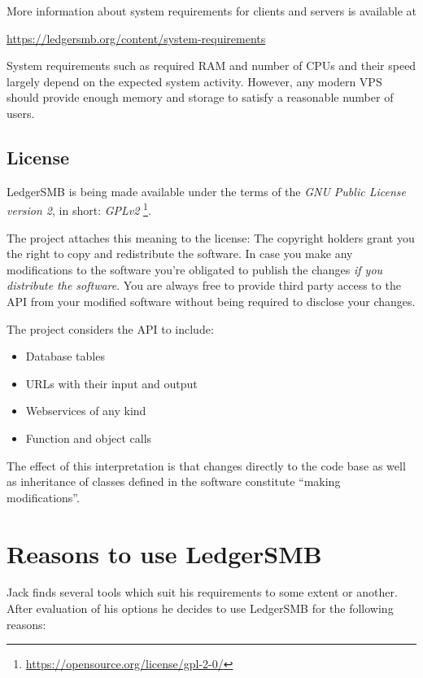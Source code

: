 More information about system requirements for clients and servers is available at

\href{https://ledgersmb.org/content/system-requirements}{https://ledgersmb.org/content/system-requirements} 

System requirements such as required RAM and number of CPUs and their speed
largely depend on the expected system activity. However, any modern \acrshort{VPS} should
provide enough memory and storage to satisfy a reasonable number of users.

\section{License}
\label{sec-ledgersmb-license}

LedgerSMB is being made available under the terms of the
\textit{GNU Public License version 2}, in short: \textit{GPLv2}
\footnote{\url{https://opensource.org/license/gpl-2-0/}}.

The project attaches this meaning to the license:
The copyright holders grant you the right to copy and
redistribute the software.  In case you make any modifications to the software
you're obligated to publish the changes \textit{if you distribute the software}.  You are always free to provide third party access to
the \acrshort{API} from your modified software without being required to disclose your changes.

The project considers the \acrshort{API} to include:
\begin{itemize}
\item Database tables
\item URLs with their input and output
\item Webservices of any kind
\item Function and object calls
\end{itemize}

The effect of this interpretation is that changes directly to the code base as well as inheritance of classes defined in the software constitute ``making modifications''.

\chapter{Reasons to use LedgerSMB}
\label{cha-advocacy}

Jack finds several tools which suit his requirements to some extent or another.
After evaluation of his options he decides to use LedgerSMB for the following reasons:

